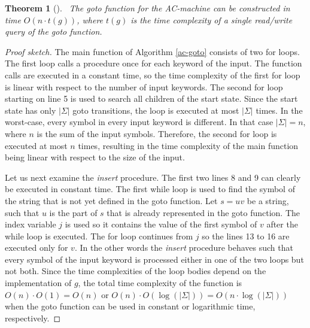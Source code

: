 \documentclass[english,twoside,censored,csm,algorithms-track-2020]{HYthesisML}
\theoremstyle{plain}
\newtheorem{theorem}{Theorem}[chapter]
\theoremstyle{definition}
\begin{document}
\begin{theorem}[]~\label{thm-time-goto}
  The goto function for the AC-machine can be constructed in time $O(n \cdot t(g))$,
  where $t(g)$ is the time complexity of a single read/write query of the
  goto function.
\end{theorem}
\begin{proof}[Proof sketch]
The main function of Algorithm \ref{ac-goto} consists of two for loops.
The first loop calls a procedure once for each keyword of the input. The function calls are
executed in a constant time, so the time complexity of the first for loop is linear with respect
to the number of input keywords. The second for loop starting on line 5 is used to search all
children of the start state. Since the start state has only $|\Sigma|$ goto transitions, the loop
is executed at most $|\Sigma|$ times. In the worst-case, every symbol
in every input keyword is different. In that case $|\Sigma| = n$, where $n$ is the sum of the input
symbols. Therefore, the second for loop is executed at most $n$ times, resulting in the time complexity of
the main function being linear with respect to the size of the input.

Let us next examine the \textit{insert} procedure. The first two lines 8 and 9 can clearly be executed in
constant time. The first while loop is used to find the symbol of the string that is not yet defined
in the goto function. Let $s=uv$ be a string, such that $u$ is the part of $s$ that is already represented in the
goto function. The index variable $j$ is used so it contains the value of the first symbol of $v$ after
the while loop is executed. The for loop continues from $j$ so the lines 13 to 16 are executed
only for $v$. In the other words the \textit{insert} procedure behaves such that every symbol of
the input keyword is processed either in one of the two loops but not both. Since the time complexities
of the loop bodies depend on the implementation of $g$, the total time complexity of the function
is $O(n)\cdot O(1) = O(n)$ or $O(n)\cdot O(\log(|\Sigma|)) = O(n\cdot\log(|\Sigma|))$ when the
goto function can be used in constant or logarithmic time, respectively.

\end{proof}
\end{document}
